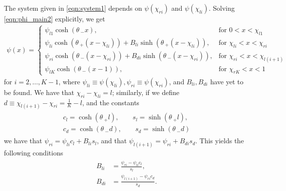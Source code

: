 \documentclass[a4paper,10pt]{article}
\newcommand{\tH}{\ensuremath{\theta\,}}
\begin{document}
The system given in \eqref{eqn:system1} depends on $\psi(\chi_{ri})$ and $\psi(\chi_{li})$. Solving \eqref{eqn:phi_main2} explicitly, we get
% 
\begin{equation}
\label{eqn:psi_soln}
	\begin{split}
	\psi(x)
   = \left\{
	\begin{matrix}
		\psi_{l1}\cosh(\tH_-x),& \text{for  }0<x<\chi_{l1}\\
		\psi_{li}\cosh(\tH_+(x-\chi_{li})) + B_{li}\sinh(\tH_+(x-\chi_{li})),& \text{for  }\chi_{li}<x<\chi_{ri}\\
		\psi_{ri}\cosh(\tH_-(x-\chi_{ri})) + B_{di}\sinh(\tH_-(x-\chi_{ri})),& \text{for  }\chi_{ri}<x<\chi_{l(i+1)}\\
		\psi_{lK}\cosh(\tH_-(x-1)),& \text{for  }\chi_{rK}<x<1
	\end{matrix}\right.
	\end{split}
\end{equation}
% 
for $i=2,\ldots,K-1$, where $\psi_{li}\equiv \psi(\chi_{li}), \psi_{ri}\equiv \psi(\chi_{ri})$, and $B_{li},B_{di}$ have yet to be found. We have that $\chi_{ri} - \chi_{li} = l$; similarly, if we define $d\equiv\chi_{l(i+1)} - \chi_{ri} = \frac{1}{K} - l$, and the constants
% 
\begin{equation*}
\begin{split}
\begin{aligned}
  c_l = \cosh(\tH_+l),\qquad s_l = \sinh(\tH_+l),\\
  c_d = \cosh(\tH_-d),\qquad s_d = \sinh(\tH_-d)
\end{aligned}
\end{split}
\end{equation*}
% 
we have that $\psi_{ri} = \psi_{li}c_l + B_{li}s_l$, and that $\psi_{l(i+1)} = \psi_{ri} + B_{di}s_d$. This yields the following conditions
% 
\begin{equation*}
\begin{split}
\begin{aligned}
  B_{li} &= \frac{\psi_{ri} - \psi_{li}c_l}{s_l},\\
  B_{di} &= \frac{\psi_{l(i+1)} - \psi_{ri}c_d}{s_d}.\\
\end{aligned}
\end{split}
\end{equation*}
% 
\end{document}
